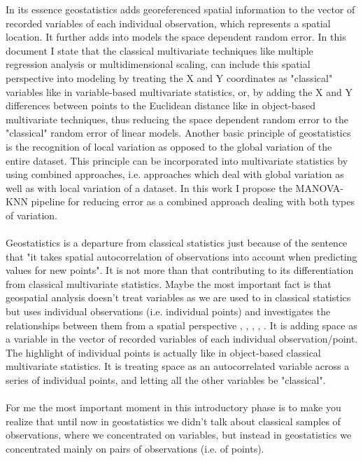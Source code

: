 \documentclass {article}
\begin{document}
In its essence geostatistics adds georeferenced spatial information to the vector of recorded variables of each individual observation, which represents a spatial location.
 It further adds into models the space dependent random error. 
In this document I state that the classical multivariate techniques like multiple regression analysis or multidimensional scaling, can include this spatial perspective into modeling by treating the X and Y coordinates as "classical" variables like in variable-based multivariate statistics, or, by adding the X and Y differences between points to the Euclidean distance like in object-based multivariate techniques, thus reducing the space dependent random error to the "classical" random error of linear models.   
Another basic principle of geostatistics is the recognition of local variation as opposed to the global variation of the entire dataset. 
This principle can be incorporated into multivariate statistics by using combined approaches, i.e. approaches which deal with global variation as well as with local variation of a dataset.
In this work I propose the MANOVA-KNN pipeline \cite{tesileanu_introduction_2017} for reducing error as a combined approach dealing with both types of variation.
\\
\\
Geostatistics is a departure from classical statistics just because of the sentence that "it takes spatial autocorrelation of observations into account when predicting values for new points". It is not more than that contributing to its differentiation from classical multivariate statistics.
Maybe the most important fact is that geospatial analysis doesn't treat variables as we are used to in classical statistics but uses individual observations (i.e. individual points) and investigates the relationships between them from a spatial perspective \cite{cressie_statistics_1993}, \cite{webster_geostatistics_2007}, \cite{isaaks_applied_1989}, \cite{hengl_practical_2009}, \cite{johnston_using_2003}.
 It is adding space as a variable in the vector of recorded variables of each individual observation/point. The highlight of individual points is actually like in object-based classical multivariate statistics. It is treating space as an autocorrelated variable across a series of individual points, and letting all the other variables be "classical". 
\\
\\
For me the most important moment in this introductory phase is to make you realize that until now in geostatistics we didn't talk about classical samples of observations, where we concentrated on variables, but instead in geostatistics we concentrated mainly on pairs of observations (i.e. of points). 
\end{document}
